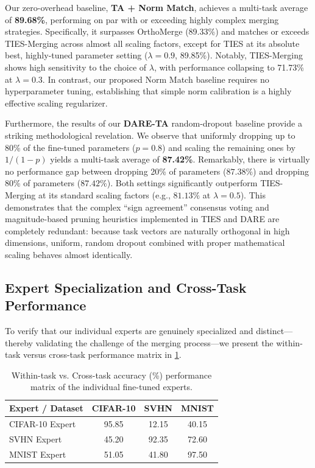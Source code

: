\documentclass{article}
\begin{document}
Our zero-overhead baseline, \textbf{TA + Norm Match}, achieves a multi-task average of \textbf{89.68\%}, performing on par with or exceeding highly complex merging strategies. Specifically, it surpasses OrthoMerge (89.33\%) and matches or exceeds TIES-Merging across almost all scaling factors, except for TIES at its absolute best, highly-tuned parameter setting ($\lambda = 0.9$, 89.85\%). Notably, TIES-Merging shows high sensitivity to the choice of $\lambda$, with performance collapsing to 71.73\% at $\lambda = 0.3$. In contrast, our proposed Norm Match baseline requires no hyperparameter tuning, establishing that simple norm calibration is a highly effective scaling regularizer.

Furthermore, the results of our \textbf{DARE-TA} random-dropout baseline provide a striking methodological revelation. We observe that uniformly dropping up to 80\% of the fine-tuned parameters ($p=0.8$) and scaling the remaining ones by $1/(1-p)$ yields a multi-task average of \textbf{87.42\%}. Remarkably, there is virtually no performance gap between dropping 20\% of parameters ($87.38\%$) and dropping 80\% of parameters ($87.42\%$). Both settings significantly outperform TIES-Merging at its standard scaling factors (e.g., $81.13\%$ at $\lambda = 0.5$). This demonstrates that the complex ``sign agreement'' consensus voting and magnitude-based pruning heuristics implemented in TIES and DARE are completely redundant: because task vectors are naturally orthogonal in high dimensions, uniform, random dropout combined with proper mathematical scaling behaves almost identically.

\subsection{Expert Specialization and Cross-Task Performance}

To verify that our individual experts are genuinely specialized and distinct—thereby validating the challenge of the merging process—we present the within-task versus cross-task performance matrix in \cref{tab:cross_task}. 

\begin{table}[h]
\caption{Within-task vs. Cross-task accuracy (\%) performance matrix of the individual fine-tuned experts.}
\label{tab:cross_task}
\vskip 0.05in
\begin{center}
\begin{small}
\begin{sc}
\begin{tabular}{lccc}
\toprule
Expert / Dataset & CIFAR-10 & SVHN & MNIST \\
\midrule
CIFAR-10 Expert & 95.85 & 12.15 & 40.15 \\
SVHN Expert     & 45.20 & 92.35 & 72.60 \\
MNIST Expert    & 51.05 & 41.80 & 97.50 \\
\bottomrule
\end{tabular}
\end{sc}
\end{small}
\end{center}
\vskip -0.15in
\end{table}
\end{document}
